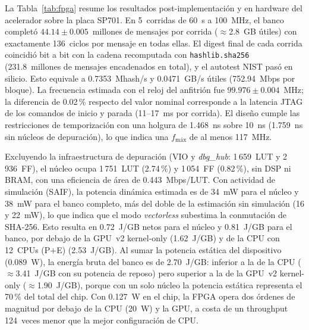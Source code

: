 

La Tabla~\ref{tab:fpga} resume los resultados post-implementación y en
hardware del acelerador sobre la placa SP701. En 5~corridas de 60~s a
100~MHz, el banco completó $44.14 \pm 0.005$~millones de mensajes por
corrida ($\approx$2.8~GB útiles) con exactamente 136~ciclos por mensaje en
todas ellas. El digest final de cada corrida coincidió bit a bit con la
cadena recomputada con \texttt{hashlib.sha256} (231.8~millones de mensajes
encadenados en total), y el autotest NIST pasó en silicio. Esto equivale a
0.7353~Mhash/s y 0.0471~GB/s útiles (752.94~Mbps por bloque). La frecuencia
estimada con el reloj del anfitrión fue $99.976 \pm 0.004$~MHz; la diferencia
de 0.02\,\% respecto del valor nominal corresponde a la latencia JTAG de los
comandos de inicio y parada (11--17~ms por corrida). El diseño cumple las
restricciones de temporización con una holgura de 1.468~ns sobre 10~ns
(1.759~ns sin núcleos de depuración), lo que indica una $f_{\text{máx}}$ de
al menos 117~MHz.

Excluyendo la infraestructura de depuración (VIO y \textit{dbg\_hub}:
1\,659~LUT y 2\,936~FF), el núcleo ocupa 1\,751~LUT (2.74\,\%) y 1\,054~FF
(0.82\,\%), sin DSP ni BRAM, con una eficiencia de área de 0.443~Mbps/LUT.
Con actividad de simulación (SAIF), la potencia dinámica estimada es de
34~mW para el núcleo y 38~mW para el banco completo, más del doble de la
estimación sin simulación (16 y 22~mW), lo que indica que el modo
\textit{vectorless} subestima la conmutación de SHA-256. Esto resulta en
0.72~J/GB netos para el núcleo y 0.81~J/GB para el banco, por debajo de la
GPU~v2 kernel-only (1.62~J/GB) y de la CPU con 12~CPUs (P+E) (2.53~J/GB).
Al sumar la potencia estática del dispositivo (0.089~W), la energía bruta
del banco es de 2.70~J/GB: inferior a la de la CPU ($\approx$3.41~J/GB con
su potencia de reposo) pero superior a la de la GPU~v2 kernel-only
($\approx$1.90~J/GB), porque con un solo núcleo la potencia estática
representa el 70\,\% del total del chip. Con 0.127~W en el chip, la FPGA
opera dos órdenes de magnitud por debajo de la CPU (20~W) y la GPU, a costa
de un throughput 124~veces menor que la mejor configuración de CPU.



